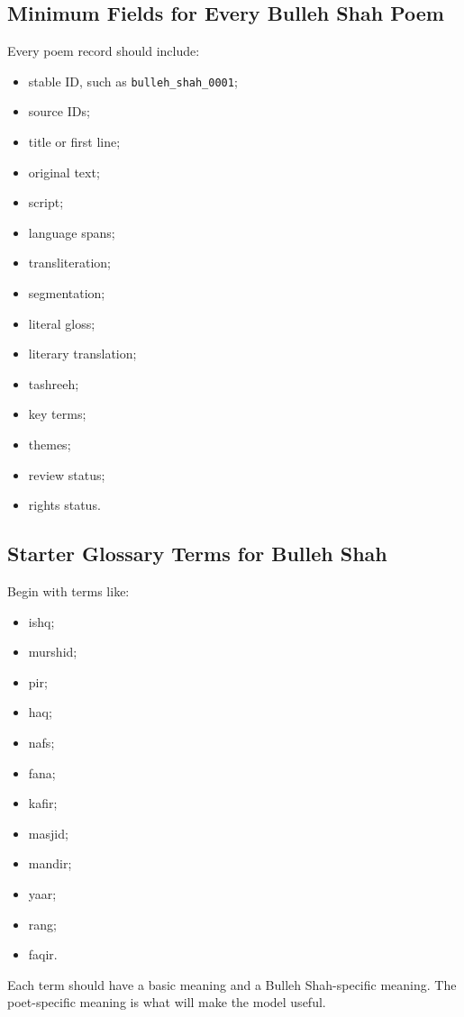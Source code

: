 \documentclass[11pt]{article}
\begin{document}
\subsection{Minimum Fields for Every Bulleh Shah Poem}

Every poem record should include:

\begin{itemize}
  \item stable ID, such as \verb|bulleh_shah_0001|;
  \item source IDs;
  \item title or first line;
  \item original text;
  \item script;
  \item language spans;
  \item transliteration;
  \item segmentation;
  \item literal gloss;
  \item literary translation;
  \item tashreeh;
  \item key terms;
  \item themes;
  \item review status;
  \item rights status.
\end{itemize}

\subsection{Starter Glossary Terms for Bulleh Shah}

Begin with terms like:

\begin{itemize}
  \item ishq;
  \item murshid;
  \item pir;
  \item haq;
  \item nafs;
  \item fana;
  \item kafir;
  \item masjid;
  \item mandir;
  \item yaar;
  \item rang;
  \item faqir.
\end{itemize}

Each term should have a basic meaning and a Bulleh Shah-specific meaning. The
poet-specific meaning is what will make the model useful.
\end{document}
